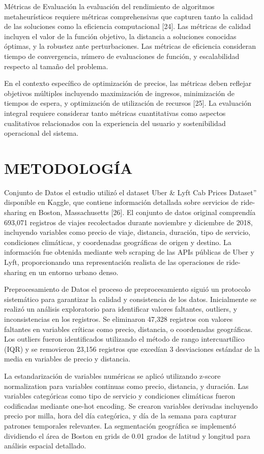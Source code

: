 \documentclass[12pt,a4paper,twocolumn]{article}
\begin{document}
Métricas de Evaluación la evaluación del rendimiento de algoritmos metaheurísticos requiere métricas comprehensivas que capturen tanto la calidad de las soluciones como la eficiencia computacional [24]. Las métricas de calidad incluyen el valor de la función objetivo, la distancia a soluciones conocidas óptimas, y la robustez ante perturbaciones. Las métricas de eficiencia consideran tiempo de convergencia, número de evaluaciones de función, y escalabilidad respecto al tamaño del problema.

En el contexto específico de optimización de precios, las métricas deben reflejar objetivos múltiples incluyendo maximización de ingresos, minimización de tiempos de espera, y optimización de utilización de recursos [25]. La evaluación integral requiere considerar tanto métricas cuantitativas como aspectos cualitativos relacionados con la experiencia del usuario y sostenibilidad operacional del sistema.

\section{METODOLOGÍA}

Conjunto de Datos el estudio utilizó el dataset Uber \& Lyft Cab Prices Dataset'' disponible en Kaggle, que contiene información detallada sobre servicios de ride-sharing en Boston, Massachusetts [26]. El conjunto de datos original comprendía 693,071 registros de viajes recolectados durante noviembre y diciembre de 2018, incluyendo variables como precio de viaje, distancia, duración, tipo de servicio, condiciones climáticas, y coordenadas geográficas de origen y destino. La información fue obtenida mediante web scraping de las APIs públicas de Uber y Lyft, proporcionando una representación realista de las operaciones de ride-sharing en un entorno urbano denso.

Preprocesamiento de Datos el proceso de preprocesamiento siguió un protocolo sistemático para garantizar la calidad y consistencia de los datos. Inicialmente se realizó un análisis exploratorio para identificar valores faltantes, outliers, y inconsistencias en los registros. Se eliminaron 47,328 registros con valores faltantes en variables críticas como precio, distancia, o coordenadas geográficas. Los outliers fueron identificados utilizando el método de rango intercuartílico (IQR) y se removieron 23,156 registros que excedían 3 desviaciones estándar de la media en variables de precio y distancia.

La estandarización de variables numéricas se aplicó utilizando z-score normalization para variables continuas como precio, distancia, y duración. Las variables categóricas como tipo de servicio y condiciones climáticas fueron codificadas mediante one-hot encoding. Se crearon variables derivadas incluyendo precio por milla, hora del día categórica, y día de la semana para capturar patrones temporales relevantes. La segmentación geográfica se implementó dividiendo el área de Boston en grids de 0.01 grados de latitud y longitud para análisis espacial detallado.
\end{document}
